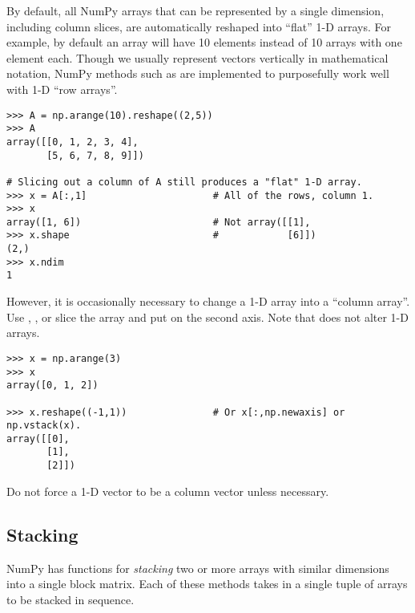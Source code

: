 \begin{info} %
By default, all NumPy arrays that can be represented by a single dimension, including column slices, are automatically reshaped into ``flat'' 1-D arrays.
For example, by default an array will have 10 elements instead of 10 arrays with one element each.
Though we usually represent vectors vertically in mathematical notation, NumPy methods such as  are implemented to purposefully work well with 1-D ``row arrays''.

\begin{lstlisting}
>>> A = np.arange(10).reshape((2,5))
>>> A
array([[0, 1, 2, 3, 4],
       [5, 6, 7, 8, 9]])

# Slicing out a column of A still produces a "flat" 1-D array.
>>> x = A[:,1]                      # All of the rows, column 1.
>>> x
array([1, 6])                       # Not array([[1],
>>> x.shape                         #            [6]])
(2,)
>>> x.ndim
1
\end{lstlisting}

However, it is occasionally necessary to change a 1-D array into a ``column array''.
Use , , or slice the array and put  on the second axis.
Note that  does not alter 1-D arrays.

\begin{lstlisting}
>>> x = np.arange(3)
>>> x
array([0, 1, 2])

>>> x.reshape((-1,1))               # Or x[:,np.newaxis] or np.vstack(x).
array([[0],
       [1],
       [2]])
\end{lstlisting}

Do not force a 1-D vector to be a column vector unless necessary.
\end{info}

\subsection*{Stacking} %

NumPy has functions for \emph{stacking} two or more arrays with similar dimensions into a single block matrix.
Each of these methods takes in a single tuple of arrays to be stacked in sequence.

